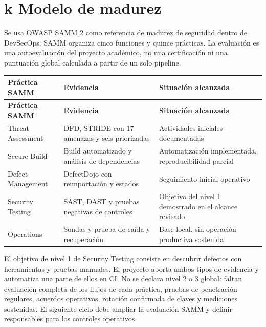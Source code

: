 \documentclass[12pt,a4paper]{article}
\begin{document}
\section*{k Modelo de madurez}
Se usa OWASP SAMM 2 como referencia de madurez de seguridad dentro de DevSecOps. SAMM organiza cinco funciones y quince prácticas. La evaluación es una autoevaluación del proyecto académico, no una certificación ni una puntuación global calculada a partir de un solo pipeline.\par
{\small\setlength{\tabcolsep}{4pt}\renewcommand{\arraystretch}{1.18}
\begin{longtable}{>{\RaggedRight\arraybackslash}p{}>{\RaggedRight\arraybackslash}p{}>{\RaggedRight\arraybackslash}p{}}
\toprule
\textbf{Práctica SAMM} & \textbf{Evidencia} & \textbf{Situación alcanzada} \\
\midrule\endfirsthead
\toprule
\textbf{Práctica SAMM} & \textbf{Evidencia} & \textbf{Situación alcanzada} \\
\midrule\endhead
\bottomrule\endfoot
Threat Assessment & DFD, STRIDE con 17 amenazas y seis priorizadas & Actividades iniciales documentadas \\[3pt]
Secure Build & Build automatizado y análisis de dependencias & Automatización implementada, reproducibilidad parcial \\[3pt]
Defect Management & DefectDojo con reimportación y estados & Seguimiento inicial operativo \\[3pt]
Security Testing & SAST, DAST y pruebas negativas de controles & Objetivo del nivel 1 demostrado en el alcance revisado \\[3pt]
Operations & Sondas y prueba de caída y recuperación & Base local, sin operación productiva sostenida \\[3pt]
\end{longtable}}
El objetivo de nivel 1 de Security Testing consiste en descubrir defectos con herramientas y pruebas manuales. El proyecto aporta ambos tipos de evidencia y automatiza una parte de ellos en CI. No se declara nivel 2 o 3 global: faltan evaluación completa de los flujos de cada práctica, pruebas de penetración regulares, acuerdos operativos, rotación confirmada de claves y mediciones sostenidas. El siguiente ciclo debe ampliar la evaluación SAMM y definir responsables para los controles operativos.\par
\end{document}
